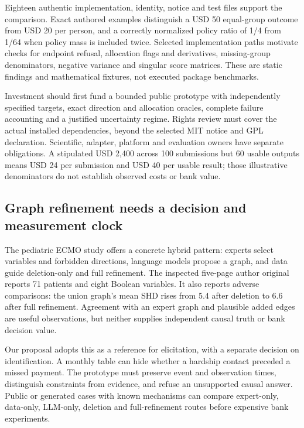 Eighteen authentic implementation, identity, notice and test files
support the comparison. Exact authored examples distinguish a USD 50
equal-group outcome from USD 20 per person, and a correctly normalized
policy ratio of 1/4 from 1/64 when policy mass is included twice.
Selected implementation paths motivate checks for endpoint refusal,
allocation flags and derivatives, missing-group denominators, negative
variance and singular score matrices. These are static findings and
mathematical fixtures, not executed package benchmarks.
\citep{exec24_interference_reference}

Investment should first fund a bounded public prototype with
independently specified targets, exact direction and allocation oracles,
complete failure accounting and a justified uncertainty regime. Rights
review must cover the actual installed dependencies, beyond the selected
MIT notice and GPL declaration. Scientific, adapter, platform and
evaluation owners have separate obligations. A stipulated USD 2,400
across 100 submissions but 60 usable outputs means USD 24 per submission
and USD 40 per usable result; those illustrative denominators do not
establish observed costs or bank value.
\citep{exec24_interference_mossspider,exec24_interference_inferference,exec24_interference_reference}

\hypertarget{graph-refinement-needs-a-decision-and-measurement-clock}{%
\subsection{Graph refinement needs a decision and measurement
clock}\label{graph-refinement-needs-a-decision-and-measurement-clock}}

The pediatric ECMO study offers a concrete hybrid pattern: experts
select variables and forbidden directions, language models propose a
graph, and data guide deletion-only and full refinement. The inspected
five-page author original reports 71 patients and eight Boolean
variables. It also reports adverse comparisons: the union graph's mean
SHD rises from 5.4 after deletion to 6.6 after full refinement.
Agreement with an expert graph and plausible added edges are useful
observations, but neither supplies independent causal truth or bank
decision value. \citep{exec24_ecmo_original}

Our proposal adopts this as a reference for elicitation, with a separate
decision on identification. A monthly table can hide whether a hardship
contact preceded a missed payment. The prototype must preserve event and
observation times, distinguish constraints from evidence, and refuse an
unsupported causal answer. Public or generated cases with known
mechanisms can compare expert-only, data-only, LLM-only, deletion and
full-refinement routes before expensive bank experiments.
\citep{exec24_ecmo_reference}

